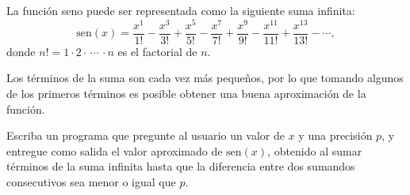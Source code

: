 La función seno puede ser representada
como la siguiente suma infinita:
\[
  \text{sen}(x) =
    \frac{x^{ 1}}{{ 1}!} -
    \frac{x^{ 3}}{{ 3}!} +
    \frac{x^{ 5}}{{ 5}!} -
    \frac{x^{ 7}}{{ 7}!} +
    \frac{x^{ 9}}{{ 9}!} -
    \frac{x^{11}}{{11}!} +
    \frac{x^{13}}{{13}!} -
    \cdots,
\]
donde \(n! = 1\cdot 2\cdot\,\cdots\,\cdot n\)
es el factorial de \(n\).

Los términos de la suma son cada vez más pequeños,
por lo que tomando algunos de los primeros términos
es posible obtener una buena aproximación de la función.

Escriba un programa que pregunte al usuario
un valor de \(x\) y una precisión \(p\),
y entregue como salida el valor aproximado de \(\text{sen}(x)\),
obtenido al sumar términos de la suma infinita
hasta que la diferencia entre dos sumandos consecutivos
sea menor o igual que \(p\).

\begin{minipage}[t]{.40\textwidth}
  
\end{minipage}

